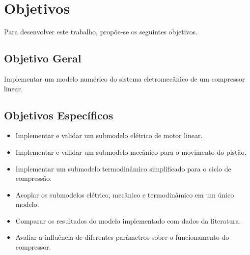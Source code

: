 \section{Objetivos}

Para desenvolver este trabalho, propõe-se os seguintes objetivos.

\subsection{Objetivo Geral}

Implementar um modelo numérico do sistema eletromecânico de um compressor linear.

\subsection{Objetivos Específicos}

\begin{itemize}
\item
Implementar e validar um submodelo elétrico de motor linear.
\item
Implementar e validar um submodelo mecânico para o movimento do pistão.
\item
Implementar um submodelo termodinâmico simplificado para o ciclo de compressão.
\item
Acoplar os submodelos elétrico, mecânico e termodinâmico em um único modelo.
\item
Comparar  os resultados do modelo implementado com dados da literatura.
\item
Avaliar a influência de diferentes parâmetros sobre o funcionamento do compressor.
\end{itemize}